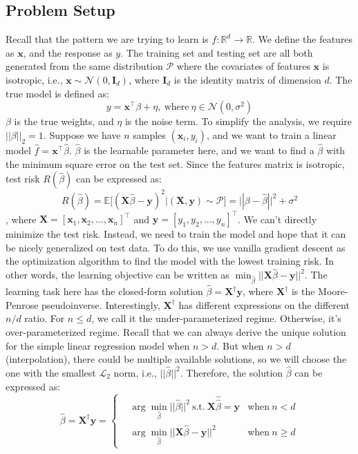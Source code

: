 \documentclass{article}
\begin{document}
\subsection{Problem Setup}
Recall that the pattern we are trying to learn is $f: \mathbb{R}^d \to \mathbb{R}$. We define the features as $\mathbf{x}$, and the response as $y$. The training set and testing set are all both generated from the same distribution $\mathcal{P}$ where the covariates of features $\mathbf{x}$ is isotropic, i.e., $\mathbf{x} \sim \mathcal{N}(0, \mathbf{I}_d)$, where $\mathbf{I}_d$ is the identity matrix of dimension $d$. The true model is defined as:
\begin{equation}
	y = \mathbf{x}^\intercal \beta + \eta, \ \text{where} \ \eta \in \mathcal{N}(0, \sigma^2)
\end{equation}
$\beta$ is the true weights, and $\eta$ is the noise term. To simplify the analysis, we require $||\beta||_2 = 1$. Suppose we have $n$ samples $(\mathbf{x}_i, y_i)$, and we want to train a linear model $\hat{f} = \mathbf{x}^\intercal \hat{\beta}$. $\hat{\beta}$ is the learnable parameter here, and we want to find a $\hat{\beta}$ with the minimum square error on the test set. Since the features matrix is isotropic, test risk $R(\hat{\beta})$ can be expressed as:
\begin{equation}
	R(\hat{\beta}) = \mathbb{E}[(\mathbf{X} \hat{\beta} - \mathbf{y})^2|(\mathbf{X}, \mathbf{y}) \sim \mathcal{P}] = ||\beta - \hat{\beta}||^2 + \sigma^2
\end{equation} 
, where $\mathbf{X} = [\mathbf{x}_1, \mathbf{x}_2, ..., \mathbf{x}_n]^\intercal$ and $\mathbf{y} = [y_1, y_2, ..., y_n]^\intercal$. We can't directly minimize the test risk. Instead, we need to train the model and hope that it can be nicely generalized on test data. To do this, we use vanilla gradient descent as the optimization algorithm to find the model with the lowest training risk. In other words, the learning objective can be written as $\min_{\hat{\beta}} ||\mathbf{X} \hat{\beta} - \mathbf{y}||^2$. The learning task here has the closed-form solution $\hat{\beta} = \mathbf{X}^\dagger\mathbf{y}$, where $\mathbf{X}^\dagger$ is the Moore-Penrose pseudoinverse. Interestingly, $\mathbf{X}^\dagger$ has different expressions on the different $n/d$ ratio. For $n \leq d$, we call it the under-parameterized regime. Otherwise, it's over-parameterized regime. Recall that we can always derive the unique solution for the simple linear regression model when $n > d$. But when $n > d$ (interpolation), there could be multiple available solutions, so we will choose the one with the smallest $\mathcal{L}_2$ norm, i.e., $||\hat{\beta}||^2$. Therefore, the solution $\hat{\beta}$ can be expressed as:
\begin{equation}
	\hat{\beta} = \mathbf{X}^\dagger \mathbf{y} = \left\{
	\begin{aligned}
		& \arg\min_{\hat{\beta}}||\hat{\beta}||^2 \  \text{s.t.} \ \mathbf{X}\hat{\hat{\beta}} = \mathbf{y} & \text{when} \ n < d\\
		& \arg\min_{\hat{\beta}}||\mathbf{X}\hat{\beta} - \mathbf{y}||^2 & \text{when} \ n \geq d
	\end{aligned}
	\right.
\end{equation}
\end{document}
